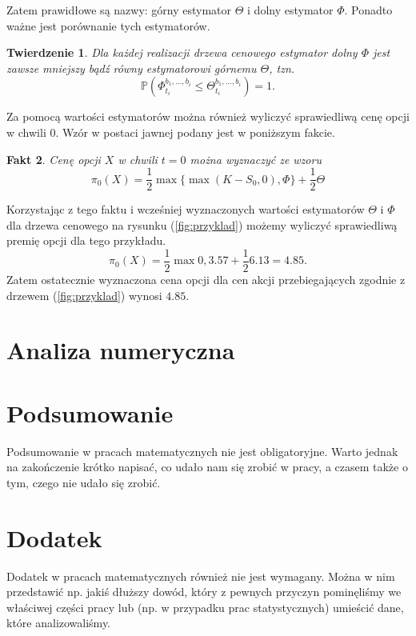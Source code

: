 \documentclass[]{pwr_wmat_praca_dyplomowa}
\theoremstyle{plain}
\newtheorem{theorem}{Twierdzenie}
\numberwithin{theorem}{chapter}
\newtheorem{fact}[theorem]{Fakt}
\theoremstyle{definition}
\numberwithin{theorem}{chapter}
\begin{document}
\noindent Zatem prawidłowe są nazwy: górny estymator $\Theta$ i dolny estymator $\Phi$. Ponadto ważne jest porównanie tych estymatorów.
\begin{theorem}
Dla każdej realizacji drzewa cenowego estymator dolny $\Phi$ jest zawsze mniejszy bądź równy estymatorowi górnemu $\Theta$, tzn.
\begin{equation*}
\mathbb{P}(\Phi_{t_i}^{b_1,\ldots,b_i}\leq \Theta_{t_i}^{b_1,\ldots,b_i}) = 1.
\end{equation*}
\end{theorem} 

\noindent Za pomocą wartości estymatorów można również wyliczyć sprawiedliwą cenę opcji w chwili $0$. Wzór w postaci jawnej podany jest w poniższym fakcie.
\begin{fact}
Cenę opcji $X$ w chwili $t=0$ można wyznaczyć ze wzoru
\begin{equation*}
\pi_0(X) = \frac{1}{2}\max\{\max(K-S_0,0),\Phi\} + \frac{1}{2}\Theta
\end{equation*}
\end{fact}

\noindent Korzystając z tego faktu i wcześniej wyznaczonych wartości estymatorów $\Theta$ i $\Phi$ dla drzewa cenowego na rysunku (\ref{fig:przyklad}) możemy wyliczyć sprawiedliwą premię opcji dla tego przykładu.
\begin{equation*}
\pi_0(X) = \frac{1}{2}\max{0,3.57}+\frac{1}{2} 6.13 = 4.85.
\end{equation*}
Zatem ostatecznie wyznaczona cena opcji dla cen akcji przebiegających zgodnie z drzewem (\ref{fig:przyklad}) wynosi $4.85.$
\chapter{Analiza numeryczna}

{\backmatter \chapter{Podsumowanie}}
Podsumowanie w pracach matematycznych nie jest obligatoryjne. Warto jednak na zakończenie krótko napisać, co udało nam się zrobić w pracy, a czasem także o tym, czego nie udało się zrobić.

{\backmatter \chapter{Dodatek}}
Dodatek w pracach matematycznych również nie jest wymagany. Można w nim przedstawić np. jakiś dłuższy dowód, który z pewnych przyczyn pominęliśmy we właściwej części pracy lub (np. w przypadku prac statystycznych) umieścić dane, które analizowaliśmy.
\end{document}
